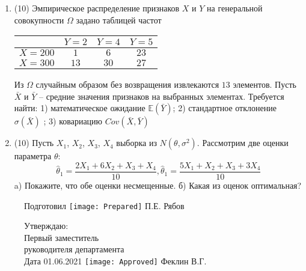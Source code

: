\documentclass[a4paper,10pt]{article}
\begin{document}
\begin{enumerate}
\item


(10) Эмпирическое распределение признаков $X$ и $Y$ на генеральной совокупности $\Omega$ задано таблицей частот  
 
\begin{tabular}{ | c | c | c | c | }
\hline
 & $Y = 2$ & $Y = 4$ & $Y = 5$  \\ \hline
$X = 200$ & $1$ & $6$ & $23$\\ \hline
$X = 300$ & $13$ & $30$ & $27$\\
\hline
\end{tabular}

Из $\Omega$ случайным образом без возвращения извлекаются $13$ элементов. 
Пусть $\bar X$ и $\bar Y$ – средние значения признаков на выбранных элементах. 
Требуется найти: 1) математическое ожидание $\mathbb{E}(\bar Y)$; 2) стандартное отклонение $\sigma(\bar X)$ ; 
3) ковариацию $Cov(\bar X, \bar Y)$


\item


(10) Пусть $X _{1}$, $X _{2}$, $X _{3}$, $X _{4}$ выборка из $N(\theta, \sigma ^{2})$. Рассмотрим две оценки параметра $\theta$:
\[\hat \theta _{1} = \frac{2X _{1} + 6X _{2} + X _{3} + X _{4}}{10}, \hat \theta _{1} = \frac{5X _{1} + X _{2} + X _{3} + 3X _{4}}{10}\]
a) Покажите, что обе оценки несмещенные.
б) Какая из оценок оптимальная?


\end{enumerate}

\begin{figure}[H]
	Подготовил
	\hfill
	\texttt{[image: Prepared]}
	П.Е. Рябов
\end{figure}


\begin{figure}[H]
	Утверждаю:\\
	Первый заместитель\\
	руководителя департамента\\
	Дата 01.06.2021
	\hfill
	\texttt{[image: Approved]}
	Феклин В.Г.
\end{figure}
\end{document}
